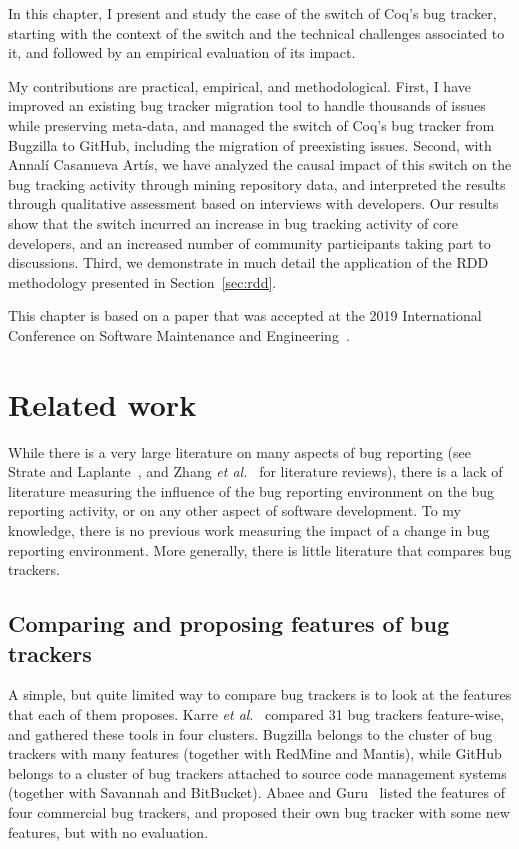 In this chapter, I present and study the case of the switch of Coq's bug tracker, starting with the context of the switch and the technical challenges associated to it, and followed by an empirical evaluation of its impact.

My contributions are practical, empirical, and methodological.
First, I have improved an existing bug tracker migration tool to handle thousands of issues while preserving meta-data, and managed the switch of Coq's bug tracker from Bugzilla to GitHub, including the migration of preexisting issues.
Second, with Annal\'i Casanueva Art\'is, we have analyzed the causal impact of this switch on the bug tracking activity through mining repository data, and interpreted the results through qualitative assessment based on interviews with developers.
Our results show that the switch incurred an increase in bug tracking activity of core developers, and an increased number of community participants taking part to discussions.
Third, we demonstrate in much detail the application of the RDD methodology presented in Section~\ref{sec:rdd}.

This chapter is based on a paper that was accepted at the 2019 International Conference on Software Maintenance and Engineering~\cite{zimmermann:hal-01951176}.

\section{Related work}

While there is a very large literature on many aspects of bug reporting (see Strate and Laplante~\cite{strate2013literature}, and Zhang \emph{et al.}~\cite{zhang2016literature} for literature reviews), there is a lack of literature measuring the influence of the bug reporting environment on the bug reporting activity, or on any other aspect of software development.
To my knowledge, there is no previous work measuring the impact of a change in bug reporting environment.
More generally, there is little literature that compares bug trackers.

\subsection{Comparing and proposing features of bug trackers}

A simple, but quite limited way to compare bug trackers is to look at the features that each of them proposes.
Karre \emph{et al}.~\cite{karre2017does} compared 31 bug trackers feature-wise, and gathered these tools in four clusters.
Bugzilla belongs to the cluster of bug trackers with many features (together with RedMine and Mantis), while GitHub belongs to a cluster of bug trackers attached to source code management systems (together with Savannah and BitBucket).
Abaee and Guru~\cite{abaee2010enhancement} listed the features of four commercial bug trackers, and proposed their own bug tracker with some new features, but with no evaluation.

